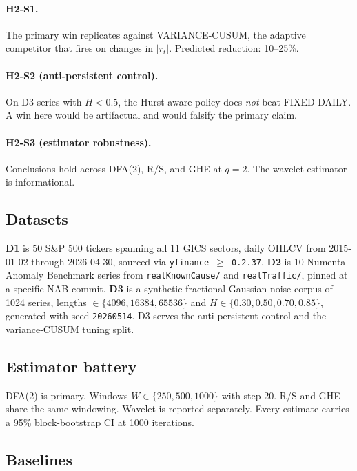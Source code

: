 \documentclass[11pt]{article}
\begin{document}
\paragraph{H2-S1.} The primary win replicates against VARIANCE-CUSUM, the adaptive competitor that fires on changes in $|r_t|$. Predicted reduction: 10--25\%.

\paragraph{H2-S2 (anti-persistent control).} On D3 series with $H<0.5$, the Hurst-aware policy does \emph{not} beat FIXED-DAILY. A win here would be artifactual and would falsify the primary claim.

\paragraph{H2-S3 (estimator robustness).} Conclusions hold across DFA(2), R/S, and GHE at $q=2$. The wavelet estimator is informational.

\subsection{Datasets}

\textbf{D1} is 50 S\&P 500 tickers spanning all 11 GICS sectors, daily OHLCV from 2015-01-02 through 2026-04-30, sourced via \texttt{yfinance $\geq$ 0.2.37}. \textbf{D2} is 10 Numenta Anomaly Benchmark series from \texttt{realKnownCause/} and \texttt{realTraffic/}, pinned at a specific NAB commit. \textbf{D3} is a synthetic fractional Gaussian noise corpus of 1024 series, lengths $\in\{4096, 16384, 65536\}$ and $H\in\{0.30, 0.50, 0.70, 0.85\}$, generated with seed \texttt{20260514}. D3 serves the anti-persistent control and the variance-CUSUM tuning split.

\subsection{Estimator battery}

DFA(2) is primary. Windows $W\in\{250, 500, 1000\}$ with step 20. R/S and GHE share the same windowing. Wavelet is reported separately. Every estimate carries a 95\% block-bootstrap CI at 1000 iterations.

\subsection{Baselines}
\end{document}
